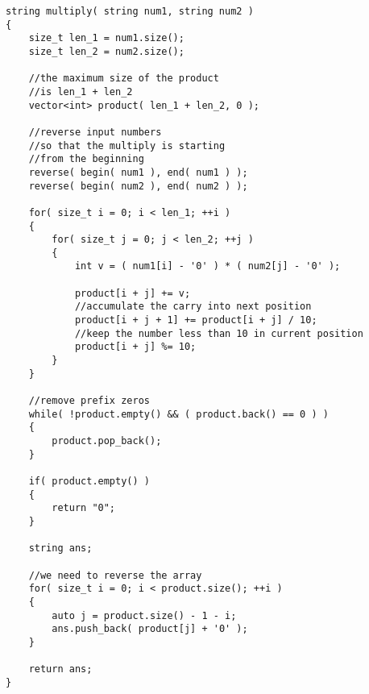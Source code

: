 \setcounter{lstlisting}{0}
\begin{lstlisting}[style=customc, caption={Mathematical Way}]
string multiply( string num1, string num2 )
{
    size_t len_1 = num1.size();
    size_t len_2 = num2.size();

    //the maximum size of the product
    //is len_1 + len_2
    vector<int> product( len_1 + len_2, 0 );

    //reverse input numbers
    //so that the multiply is starting
    //from the beginning
    reverse( begin( num1 ), end( num1 ) );
    reverse( begin( num2 ), end( num2 ) );

    for( size_t i = 0; i < len_1; ++i )
    {
        for( size_t j = 0; j < len_2; ++j )
        {
            int v = ( num1[i] - '0' ) * ( num2[j] - '0' );

            product[i + j] += v;
            //accumulate the carry into next position
            product[i + j + 1] += product[i + j] / 10;
            //keep the number less than 10 in current position
            product[i + j] %= 10;
        }
    }

    //remove prefix zeros
    while( !product.empty() && ( product.back() == 0 ) )
    {
        product.pop_back();
    }

    if( product.empty() )
    {
        return "0";
    }

    string ans;

    //we need to reverse the array
    for( size_t i = 0; i < product.size(); ++i )
    {
        auto j = product.size() - 1 - i;
        ans.push_back( product[j] + '0' );
    }

    return ans;
}
\end{lstlisting}